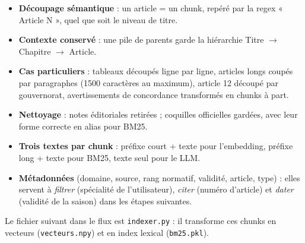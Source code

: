 \documentclass[11pt,a4paper]{article}
\newcommand{\fichier}[1]{\texttt{#1}}
\begin{document}
\begin{itemize}
  \item \textbf{Découpage sémantique} : un article = un chunk, repéré par la regex
        « Article N », quel que soit le niveau de titre.
  \item \textbf{Contexte conservé} : une pile de parents garde la hiérarchie
        Titre $\rightarrow$ Chapitre $\rightarrow$ Article.
  \item \textbf{Cas particuliers} : tableaux découpés ligne par ligne, articles longs coupés
        par paragraphes (1500 caractères au maximum), article 12 découpé par gouvernorat,
        avertissements de concordance transformés en chunks à part.
  \item \textbf{Nettoyage} : notes éditoriales retirées ; coquilles officielles gardées, avec
        leur forme correcte en alias pour BM25.
  \item \textbf{Trois textes par chunk} : préfixe court + texte pour l'embedding, préfixe
        long + texte pour BM25, texte seul pour le LLM.
  \item \textbf{Métadonnées} (domaine, source, rang normatif, validité, article, type) : elles
        servent à \emph{filtrer} (spécialité de l'utilisateur), \emph{citer} (numéro d'article)
        et \emph{dater} (validité de la saison) dans les étapes suivantes.
\end{itemize}

Le fichier suivant dans le flux est \fichier{indexer.py} : il transforme ces chunks en
vecteurs (\fichier{vecteurs.npy}) et en index lexical (\fichier{bm25.pkl}).
\end{document}
